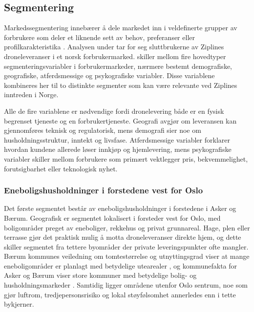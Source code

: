 \subsection{Segmentering}

Markedssegmentering innebærer å dele markedet inn i veldefinerte grupper av
forbrukere som deler et liknende sett av behov, preferanser eller
profilkarakteristika \parencite{kotlerkellerchernev2022}. Analysen under tar
for seg sluttbrukerne av Ziplines droneleveranser i et norsk
forbrukermarked. \textcite{kotlerkellerchernev2022} skiller mellom fire
hovedtyper segmenteringsvariabler i forbrukermarkeder, nærmere bestemt
demografiske, geografiske, atferdsmessige og psykografiske variabler. Disse
variablene kombineres her til to distinkte segmenter som kan være relevante
ved Ziplines inntreden i Norge.

Alle de fire variablene er nødvendige fordi dronelevering både er en fysisk
begrenset tjeneste og en forbrukertjeneste. Geografi avgjør om leveransen kan
gjennomføres teknisk og regulatorisk, mens demografi sier noe om
husholdningsstruktur, inntekt og livsfase. Atferdsmessige variabler forklarer
hvordan kundene allerede løser innkjøp og hjemlevering, mens psykografiske
variabler skiller mellom forbrukere som primært vektlegger pris,
bekvemmelighet, forutsigbarhet eller teknologisk nyhet.

\subsubsection{Eneboligshusholdninger i forstedene vest for Oslo}

Det første segmentet består av eneboligshusholdninger i forstedene i Asker og
Bærum. Geografisk er segmentet lokalisert i forsteder vest for Oslo, med
boligområder preget av eneboliger, rekkehus og privat grunnareal. Hage, plen
eller terrasse gjør det praktisk mulig å motta droneleveranser direkte hjem,
og dette skiller segmentet fra tettere byområder der private
leveringspunkter ofte mangler. Bærum kommunes veiledning om tomtestørrelse og
utnyttingsgrad viser at mange eneboligområder er planlagt med betydelige
utearealer \parencite{baerum_kommune_tomt}, og kommunefakta for Asker og
Bærum viser store kommuner med betydelige bolig- og husholdningsmarkeder
\parencite{ssb_kommunefakta_asker, ssb_kommunefakta_baerum}. Samtidig ligger
områdene utenfor Oslo sentrum, noe som gjør luftrom, tredjepersonsrisiko og
lokal støyfølsomhet annerledes enn i tette bykjerner.

